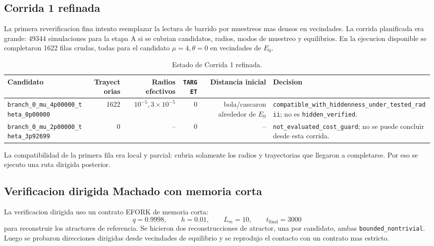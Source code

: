 \documentclass[11pt]{article}
\newcommand{\status}[1]{\texttt{\small #1}}
\newcommand{\target}{\texttt{TARGET}}
\newcommand{\hiddenverified}{\texttt{hidden\_verified}}
\newcommand{\Ezero}{E_0}
\begin{document}
\subsection{Corrida 1 refinada}

La primera reverificacion fina intento reemplazar la lectura de barrido por
muestreos mas densos en vecindades. La corrida planificada era grande:
49344 simulaciones para la etapa A si se cubrian candidatos, radios, modos de
muestreo y equilibrios. En la ejecucion disponible se completaron 1622 filas
crudas, todas para el candidato \(\mu=4,\theta=0\) en vecindades de \(\Ezero\).

\begin{table}[h]
\centering
\caption{Estado de Corrida 1 refinada.}
\small
\begin{tabularx}{\textwidth}{L{0.34\textwidth}rrrrX}
\toprule
Candidato & Trayectorias & Radios efectivos & \target{} & Distancia inicial & Decision \\
\midrule
\status{branch\_0\_mu\_4p00000\_theta\_0p00000}
& 1622 & \(10^{-5},3\times10^{-5}\) & 0 &
bola/cascaron alrededor de \(\Ezero\) &
\status{compatible\_with\_hiddenness\_under\_tested\_radii}; no es \hiddenverified. \\
\status{branch\_0\_mu\_2p00000\_theta\_3p92699}
& 0 & -- & 0 & -- &
\status{not\_evaluated\_cost\_guard}; no se puede concluir desde esta corrida. \\
\bottomrule
\end{tabularx}
\end{table}

La compatibilidad de la primera fila era local y parcial: cubria solamente los
radios y trayectorias que llegaron a completarse. Por eso se ejecuto una ruta
dirigida posterior.

\subsection{Verificacion dirigida Machado con memoria corta}

La verificacion dirigida uso un contrato EFORK de memoria corta:
\[
q=0.9998,\qquad h=0.01,\qquad L_m=10,\qquad t_{\mathrm{final}}=3000
\]
para reconstruir los atractores de referencia. Se hicieron dos reconstrucciones
de atractor, una por candidato, ambas \status{bounded\_nontrivial}. Luego se
probaron direcciones dirigidas desde vecindades de equilibrio y se reprodujo el
contacto con un contrato mas estricto.
\end{document}
